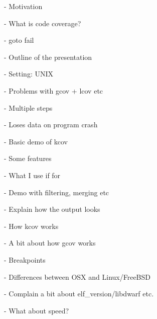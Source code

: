 - Motivation

  - What is code coverage?

  - goto fail

- Outline of the presentation


- Setting: UNIX


- Problems with gcov + lcov etc

  - Multiple steps

  - Loses data on program crash


- Basic demo of kcov


- Some features

  - What I use if for

  - Demo with filtering, merging etc

  - Explain how the output looks


- How kcov works

  - A bit about how gcov works

  - Breakpoints

  - Differences between OSX and Linux/FreeBSD

  - Complain a bit about elf_version/libdwarf etc.


- What about speed?
